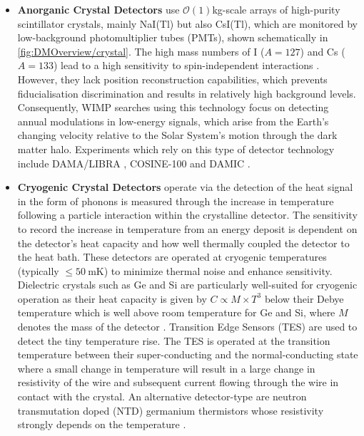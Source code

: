 \begin{itemize}
    \item \textbf{Anorganic Crystal Detectors} use $\mathcal{O}(1)$kg-scale arrays of high-purity scintillator crystals, mainly NaI(Tl) but also CsI(Tl), which are monitored by low-background photomultiplier tubes (PMTs), shown schematically in \autoref{fig:DMOverview/crystal}. The high mass numbers of I ($A=127$) and Cs ($A=133$) lead to a high sensitivity to spin-independent interactions \cite{Schumann:2019eaa}. However, they lack position reconstruction capabilities, which prevents fiducialisation discrimination and results in relatively high background levels. Consequently, WIMP searches using this technology focus on detecting annual modulations in low-energy signals, which arise from the Earth’s changing velocity relative to the Solar System's motion through the dark matter halo. Experiments which rely on this type of detector technology include DAMA/LIBRA \cite{DAMA:2008jlt}, COSINE-100 \cite{COSINE-100:2019lgn} and DAMIC \cite{Privitera:2024tpq}.
    
    \item \textbf{Cryogenic Crystal Detectors} operate via the detection of the heat signal in the form of phonons is measured through the increase in temperature following a particle interaction within the crystalline detector. The sensitivity to record the increase in temperature from an energy deposit is dependent on the detector's heat capacity and how well thermally coupled the detector to the heat bath. These detectors are operated at cryogenic temperatures (typically $\leq50~\text{mK}$) to minimize thermal noise and enhance sensitivity. Dielectric crystals such as Ge and Si are particularly well-suited for cryogenic operation as their heat capacity is given by $C \propto M \times T^3$ below their Debye temperature which is well above room temperature for Ge and Si, where $M$ denotes the mass of the detector \cite{Schumann:2019eaa}. Transition Edge Sensors (TES) are used to detect the tiny temperature rise. The TES is operated at the transition temperature between their super-conducting and the normal-conducting state where a small change in temperature will result in a large change in resistivity of the wire and subsequent current flowing through the wire in contact with the crystal. An alternative detector-type are neutron transmutation doped (NTD) germanium thermistors whose resistivity strongly depends on the temperature \cite{Schumann:2019eaa}. 
    

\end{itemize}
